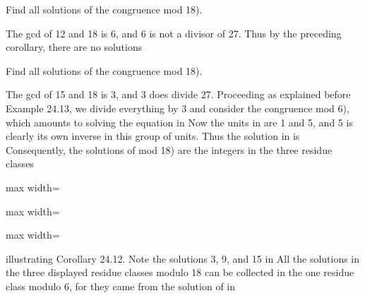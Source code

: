 \documentclass[11pt,oneside]{article}
\begin{document}
\begin{BookBody}

 Find all solutions of the congruence mod 18).

 The gcd of 12 and 18 is 6, and 6 is not a divisor of 27. Thus by the preceding corollary, there are no solutions\BookEnd{\blacktriangle}

 Find all solutions of the congruence mod 18).

 The gcd of 15 and 18 is 3, and 3 does divide 27. Proceeding as explained before Example 24.13, we divide everything by 3 and consider the congruence mod 6), which amounts to solving the equation  in  Now the units in  are 1 and 5, and 5 is clearly its own inverse in this group of units. Thus the solution in  is  Consequently, the solutions of mod 18) are the integers in the three residue classes

\begin{center}\begin{adjustbox}{max width=\linewidth}\end{adjustbox}\end{center}

\begin{center}\begin{adjustbox}{max width=\linewidth}\end{adjustbox}\end{center}

\begin{center}\begin{adjustbox}{max width=\linewidth}\end{adjustbox}\end{center}

\noindent illustrating Corollary 24.12. Note the  solutions 3, 9, and 15 in  All the solutions in the three displayed residue classes modulo 18 can be collected in the one residue class  modulo 6, for they came from the solution  of  in \BookEnd{\blacktriangle}

\end{BookBody}
\end{document}

